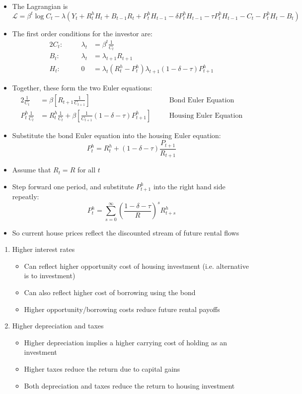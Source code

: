 \documentclass[a4paper,twoside]{article}
\numberwithin{equation}{section}
\numberwithin{figure}{section}
\begin{document}
\begin{itemize}
		\item The Lagrangian is
		\[
			\mathcal{L} = \beta^t\log C_t - \lambda(Y_t + R_t^h H_t + B_{t-1}R_t + P_t^h H_{t-1} - \delta P_t^h H_{t-1} - \tau P_t^h H_{t-1}- C_t - P_t^hH_t - B_t)
		\]
		\item The first order conditions for the investor are:
		\begin{alignat*}{2}
			C_t:\quad && \lambda_t&= \beta^t\frac{1}{C_t}\\
			B_t:\quad && \lambda_t&= \lambda_{t+1}R_{t+1}\\
			H_t:\quad && 0&= \lambda_t(R_t^h-P_t^h)\lambda_{t+1}(1-\delta-\tau)P_{t+1}^h
		\end{alignat*}
		\item Together, these form the two Euler equations:
		\begin{alignat*}{2}
			\frac{1}{C_t} &= \beta\left[R_{t+1} \frac{1}{C_{t+1}} \right] &&\text{Bond Euler Equation}\\
			P_t^h \frac{1}{C_t} &= R^h_t\frac{1}{C_t} + \beta\left[ \frac{1}{C_{t+1}} (1-\delta-\tau)P_{t+1}^h \right] \quad &&\text{Housing Euler Equation}
		\end{alignat*}
		\item Substitute the bond Euler equation into the housing Euler equation:
		\[
			P_t^h = R_t^h + (1-\delta-\tau)\frac{P_{t+1}}{R_{t+1}}
		\]
		\item Assume that \( R_t = R \) for all \( t \)
		\item Step forward one period, and substitute \( P_{t+1}^h \) into the right hand side repeatly:
		\[
			P_t^h = \sum_{s=0}^\infty \left( \frac{1-\delta-\tau}{R}\right)^s R_{t+s}^h
		\]
		\item So current house prices reflect the discounted stream of future rental flows
	\end{itemize}
	\begin{enumerate}[label=\textbf{\arabic*.}]
		\item Higher interest rates
		\begin{itemize}
			\item Can reflect higher opportunity cost of housing investment (i.e. alternative is to investment)
			\item Can also reflect higher cost of borrowing using the bond
			\item Higher opportunity/borrowing costs reduce future rental payoffs
		\end{itemize}
		\item Higher depreciation and taxes
		\begin{itemize}
			\item Higher depreciation implies a higher carrying cost of holding as an investment
			\item Higher taxes reduce the return due to capital gains
			\item Both depreciation and taxes reduce the return to housing investment
		\end{itemize}
	\end{enumerate}
\end{document}
